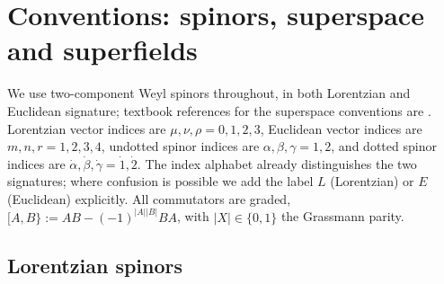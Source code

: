 \section{Conventions: spinors, superspace and superfields}\label{sec:notation}

We use two-component Weyl spinors throughout, in both Lorentzian and Euclidean
signature; textbook references for the superspace conventions are
\cite{GGRS,WeinbergIII}. Lorentzian vector indices are $\mu,\nu,\rho=0,1,2,3$,
Euclidean vector indices are $m,n,r=1,2,3,4$, undotted spinor indices are
$\alpha,\beta,\gamma=1,2$, and dotted spinor indices are
$\dot\alpha,\dot\beta,\dot\gamma=\dot1,\dot2$. The index alphabet already
distinguishes the two signatures; where confusion is possible we add the label
$L$ (Lorentzian) or $E$ (Euclidean) explicitly. All commutators are graded,
$[A,B\}:=AB-(-1)^{|A||B|}BA$, with $|X|\in\{0,1\}$ the Grassmann parity.

\subsection{Lorentzian spinors}\label{sec:notation:lorentzian}


